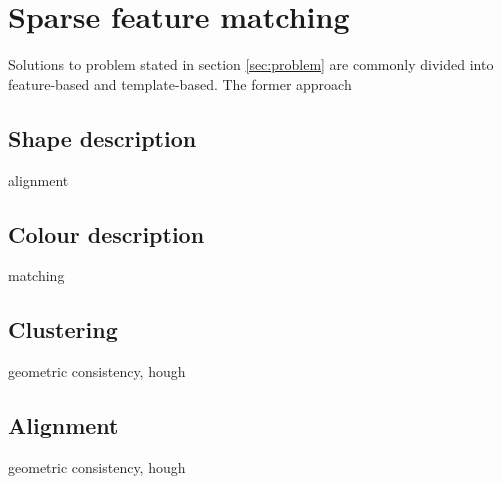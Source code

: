 
\chapter{Sparse feature matching}
\label{cha:feature}

Solutions to problem stated in section \ref{sec:problem} are commonly divided \cite{something} into feature-based and template-based. The former approach


\section{Shape description} %
\label{sec:shape} %

alignment


\section{Colour description} %
\label{sec:colour} %

matching


\section{Clustering}
\label{sec:clustering}

geometric consistency, hough


\section{Alignment}
\label{sec:alignment}

geometric consistency, hough

